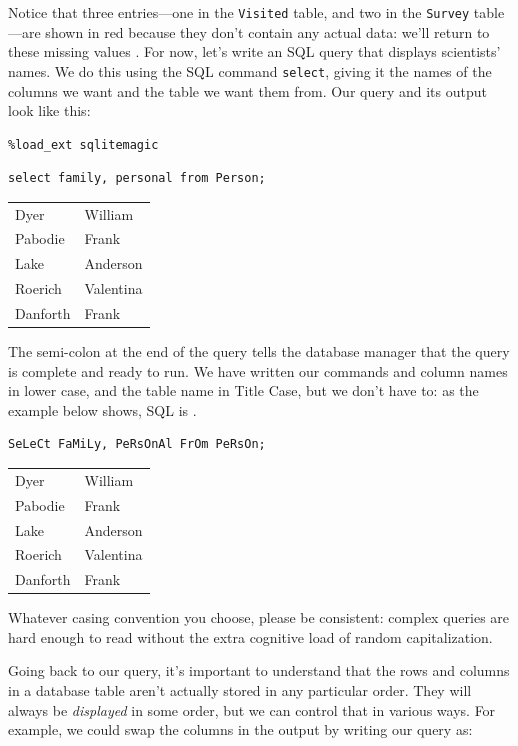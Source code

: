 \documentclass{book}
\begin{document}
Notice that three entries---one in the \texttt{Visited} table, and two
in the \texttt{Survey} table---are shown in red because they don't
contain any actual data: we'll return to these missing values
. For now, let's write an SQL query that
displays scientists' names. We do this using the SQL command
\texttt{select}, giving it the names of the columns we want and the
table we want them from. Our query and its output look like this:

\begin{verbatim}
%load_ext sqlitemagic
\end{verbatim}

\begin{verbatim}
select family, personal from Person;
\end{verbatim}

\begin{tabular}{ll}
Dyer & William \\
Pabodie & Frank \\
Lake & Anderson \\
Roerich & Valentina \\
Danforth & Frank \\
\end{tabular}

The semi-colon at the end of the query tells the database manager that
the query is complete and ready to run. We have written our commands and
column names in lower case, and the table name in Title Case, but we
don't have to: as the example below shows, SQL is
.

\begin{verbatim}
SeLeCt FaMiLy, PeRsOnAl FrOm PeRsOn;
\end{verbatim}

\begin{tabular}{ll}
Dyer & William \\
Pabodie & Frank \\
Lake & Anderson \\
Roerich & Valentina \\
Danforth & Frank \\
\end{tabular}

Whatever casing convention you choose, please be consistent: complex
queries are hard enough to read without the extra cognitive load of
random capitalization.

Going back to our query, it's important to understand that the rows and
columns in a database table aren't actually stored in any particular
order. They will always be \emph{displayed} in some order, but we can
control that in various ways. For example, we could swap the columns in
the output by writing our query as:
\end{document}
